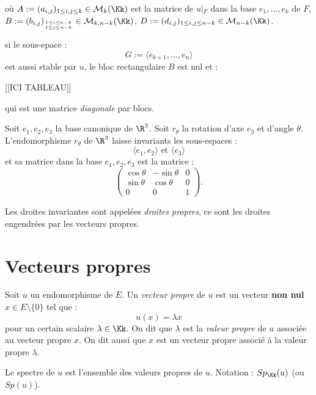 \documentclass[class=report,crop=false]{standalone}
\newcommand{\Sp}{Sp}
\newcommand{\Res}[1]{{\left | {}_{#1} \right.}}
\begin{document}
où $A:=(a_{i,j})_{1 \le i,j \le k}\in \mathcal{M}_k(\Kk)$ est la matrice de $u\Res{F}$ dans la base $e_1,...,e_k$ de $F$, $B:= (b_{i,j})_{1 \le i \le n-k\atop 1 \le j \le n-k} \in \mathcal{M}_{k,n-k}(\Kk)$, $D:= (d_{i,j})_{1 \le i,j \le n-k}\in \mathcal{M}_{n-k}(\Kk)$.

\begin{remarque*}
 si le sous-epace :
\[G:=\langle e_{k+1},...,e_n\rangle\]
est aussi stable par $u$, le bloc rectangulaire $B$ est nul et :

[[ICI TABLEAU]]
%


qui est une matrice {\it diagonale} par blocs.

\end{remarque*}
\begin{exemple}
Soit $e_1,e_2,e_3$ la base canonique de $\R^3$. Soit $r_\theta$ la rotation d'axe $e_3$ et d'angle $\theta$. L'endomorphisme $r_\theta$ de $\R^3$ laisse invariants les sous-espaces :
\[\langle e_1,e_2 \rangle \text{ et } \langle e_3 \rangle\]
et sa matrice dans la base $e_1,e_2,e_3$ est la matrice :
\[\left( \begin{array}{ccc}
\cos \theta & -\sin \theta& 0\\
\sin \theta & \cos \theta & 0\\
0&0&1
\end{array}\right) .\]
\end{exemple}

Les droites invariantes sont appelées {\it droites propres}, ce sont les droites engendrées par les vecteurs propres.

\section{Vecteurs propres}
\begin{definition}
Soit $u$ un endomorphisme de $E$. Un {\it vecteur propre} de $u$ est un vecteur {\bf non nul}  $x \in E\setminus\{0\}$ tel que :
\[u(x) = \lambda x\]
pour un certain scalaire $\lambda \in \Kk$. On dit que $\lambda$ est la {\it valeur propre}  de $u$ associée au vecteur propre $x$. On dit aussi que $x$ est un vecteur propre associé à la valeur propre $\lambda$.

Le spectre de $u$ est l'ensemble des valeurs propres de $u$. Notation : $\Sp_\Kk(u)$ (ou $\Sp(u)$). 
\end{definition}
\end{document}
